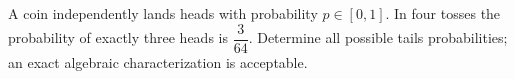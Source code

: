 A coin independently lands heads with probability $ p\in[0,1]$. In four tosses the probability of exactly three heads is $\dfrac{3}{64}$. Determine all possible tails probabilities; an exact algebraic characterization is acceptable.
